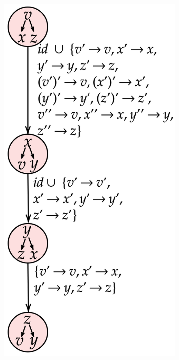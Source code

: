 \documentclass{beamer}
\newenvironment{figure*}%
{\begin{figure}}
{\end{figure}}
\begin{document}
{\begin{center}
\begin{figure}
\begin{subfigure}{0.5\textwidth}
 			\includegraphics[scale=0.15]{figs/netys/decomp3.png}
 		\end{subfigure}
 	\end{figure}
 	\end{center}
}
\end{document}
